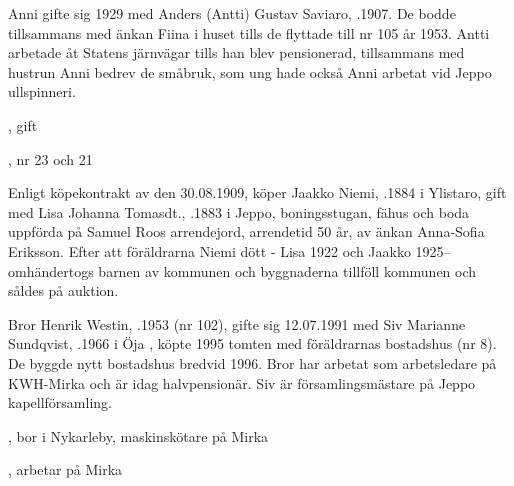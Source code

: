Anni gifte sig 1929 med Anders (Antti) Gustav Saviaro, .1907. De bodde tillsammans med änkan Fiina i huset tills de flyttade till nr 105 år 1953. Antti arbetade åt Statens järnvägar tills han blev pensionerad, tillsammans med hustrun Anni bedrev de småbruk, som ung hade också Anni  arbetat vid Jeppo ullspinneri.
\begin{jhchildren}
  \item {}, gift
  \item {}, nr 23 och 21
\end{jhchildren}


Enligt köpekontrakt av den 30.08.1909, köper Jaakko Niemi, .1884 i Ylistaro, gift med Lisa Johanna Tomasdt., .1883 i Jeppo, boningsstugan, fähus och boda uppförda på Samuel Roos arrendejord, arrendetid 50 år, av änkan Anna-Sofia Eriksson. Efter att föräldrarna Niemi dött - Lisa 1922 och Jaakko 1925--omhändertogs barnen av kommunen och byggnaderna tillföll kommunen och såldes på auktion.
\begin{jhchildren}
  \item {}
  \item {}
  \item {}
  \item {}
  \item {}
\end{jhchildren}






Bror Henrik Westin, .1953 (nr 102), gifte sig 12.07.1991 med Siv Marianne Sundqvist, .1966  i Öja , köpte 1995 tomten med föräldrarnas bostadshus (nr 8). De byggde nytt bostadshus bredvid 1996. Bror har arbetat som arbetsledare på KWH-Mirka och är idag halvpensionär. Siv är församlingsmästare på Jeppo kapellförsamling.

\begin{jhchildren}
  \item {}, bor i Nykarleby, maskinskötare på Mirka
  \item {}, arbetar på Mirka
\end{jhchildren}



